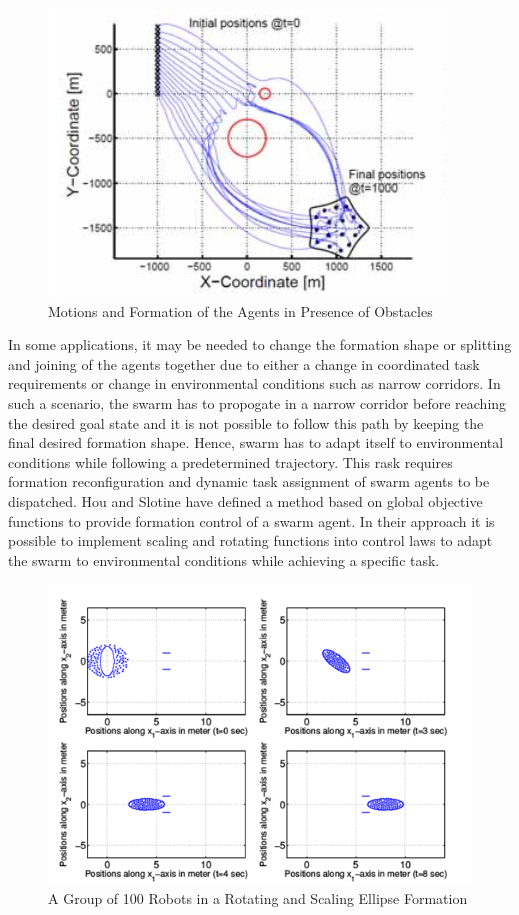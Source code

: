 \begin{figure}[H]
	\caption{Motions and Formation of the Agents in Presence of Obstacles \cite{17}} \label{samitha_obstacle}
	\centering
	\includegraphics[scale = 0.7]{samitha}
\end{figure} 

In some applications, it may be needed to change the formation shape or splitting and joining of the agents together due to either a change in coordinated task requirements or change in environmental conditions such as narrow corridors. In such a scenario, the swarm has to propogate in a narrow corridor before reaching the desired goal state and it is not possible to follow this path by keeping the final desired formation shape. Hence, swarm has to adapt itself to environmental conditions while following a predetermined trajectory. This rask requires formation reconfiguration and dynamic task assignment of swarm agents to be dispatched. Hou and Slotine \cite{8} have defined a method based on global objective functions to provide formation control of a swarm agent. In their approach it is possible to implement scaling and rotating functions into control laws to adapt the swarm to environmental conditions while achieving a specific task. 

\begin{figure}[H]
	\caption{A Group of 100 Robots in a Rotating and Scaling Ellipse Formation \cite{8}} \label{slotine_fig_ref}
	\centering
	\includegraphics[scale = 1]{slotine}
\end{figure} 

